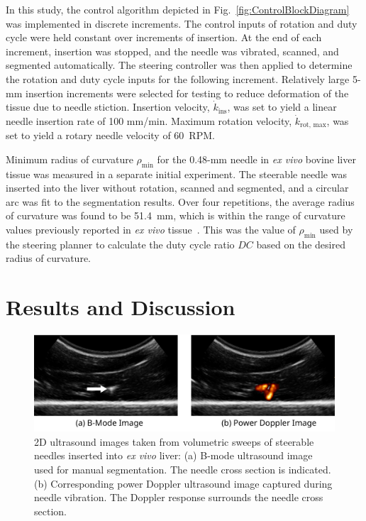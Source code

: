 In this study, the control algorithm depicted in Fig.~\ref{fig:ControlBlockDiagram} was implemented in discrete increments. The control inputs of rotation and duty cycle were held constant over increments of insertion. At the end of each increment, insertion was stopped, and the needle was vibrated, scanned, and segmented automatically. The steering controller was then applied to determine the rotation and duty cycle inputs for the following increment. Relatively large 5-mm insertion increments were selected for testing to reduce deformation of the tissue due to needle stiction. Insertion velocity, $\dot{k}_\text{ins}$, was set to yield a linear needle insertion rate of 100 mm/min. Maximum rotation velocity, $\dot{k}_\text{rot, max}$, was set to yield a rotary needle velocity of 60~RPM.

Minimum radius of curvature $\rho_{\text{min}}$ for the 0.48-mm needle in \textit{ex vivo} bovine liver tissue was measured in a separate initial experiment. The steerable needle was inserted into the liver without rotation, scanned and segmented, and a circular arc was fit to the segmentation results. Over four repetitions, the average radius of curvature was found to be 51.4~mm, which is within the range of curvature values previously reported in \textit{ex vivo} tissue~\cite{Majewicz2012}. This was the value of $\rho_{\text{min}}$ used by the steering planner to calculate the duty cycle ratio $DC$ based on the desired radius of curvature.
 
\section{Results and Discussion}
\begin{figure}[!t]
\centering
\includegraphics[width=\textwidth]{Images/Chapter2/2DUS/2DUS}%
\caption[2D ultrasound images from 3D sweeps of needle]{2D ultrasound images taken from volumetric sweeps of steerable needles inserted into \textit{ex vivo} liver: (a) B-mode ultrasound image used for manual segmentation. The needle cross section is indicated. (b) Corresponding power Doppler ultrasound image captured during needle vibration. The Doppler response surrounds the needle cross section.}
\label{fig:2DUS}
\end{figure} 


